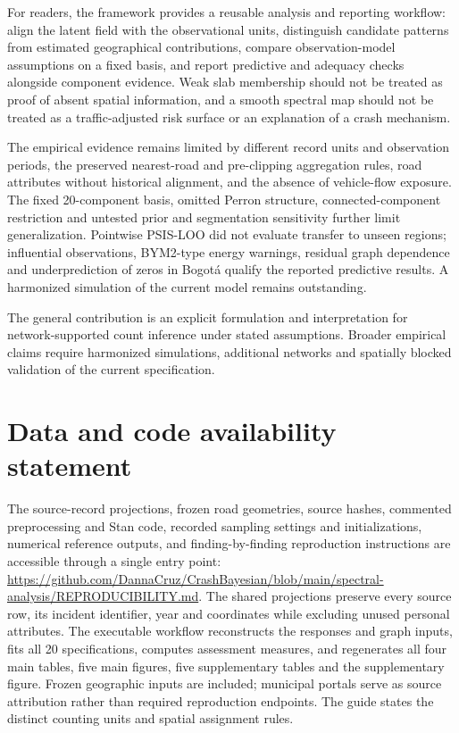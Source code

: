 \documentclass[11pt]{article}
\begin{document}
For readers, the framework provides a reusable analysis and reporting workflow: align the latent field with the observational units, distinguish candidate patterns from estimated geographical contributions, compare observation-model assumptions on a fixed basis, and report predictive and adequacy checks alongside component evidence. Weak slab membership should not be treated as proof of absent spatial information, and a smooth spectral map should not be treated as a traffic-adjusted risk surface or an explanation of a crash mechanism.

The empirical evidence remains limited by different record units and observation periods, the preserved nearest-road and pre-clipping aggregation rules, road attributes without historical alignment, and the absence of vehicle-flow exposure. The fixed 20-component basis, omitted Perron structure, connected-component restriction and untested prior and segmentation sensitivity further limit generalization. Pointwise PSIS-LOO did not evaluate transfer to unseen regions; influential observations, BYM2-type energy warnings, residual graph dependence and underprediction of zeros in Bogot\'a qualify the reported predictive results. A harmonized simulation of the current model remains outstanding.

The general contribution is an explicit formulation and interpretation for network-supported count inference under stated assumptions. Broader empirical claims require harmonized simulations, additional networks and spatially blocked validation of the current specification.

\FloatBarrier
\section*{Data and code availability statement}
The source-record projections, frozen road geometries, source hashes, commented preprocessing and Stan code, recorded sampling settings and initializations, numerical reference outputs, and finding-by-finding reproduction instructions are accessible through a single entry point: \url{https://github.com/DannaCruz/CrashBayesian/blob/main/spectral-analysis/REPRODUCIBILITY.md}. The shared projections preserve every source row, its incident identifier, year and coordinates while excluding unused personal attributes. The executable workflow reconstructs the responses and graph inputs, fits all 20 specifications, computes assessment measures, and regenerates all four main tables, five main figures, five supplementary tables and the supplementary figure. Frozen geographic inputs are included; municipal portals serve as source attribution rather than required reproduction endpoints. The guide states the distinct counting units and spatial assignment rules.
\end{document}
